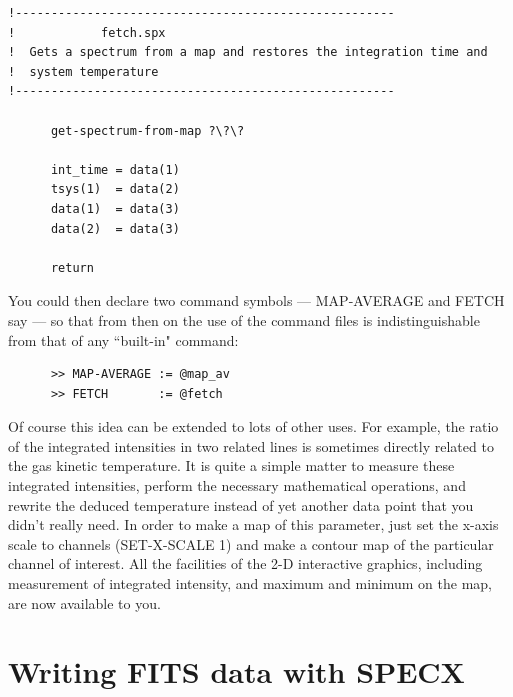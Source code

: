 \documentclass[11pt,twoside]{report}
\begin{document}
\begin{verbatim}
!-----------------------------------------------------
!            fetch.spx
!  Gets a spectrum from a map and restores the integration time and
!  system temperature
!-----------------------------------------------------

      get-spectrum-from-map ?\?\?

      int_time = data(1)
      tsys(1)  = data(2)
      data(1)  = data(3)
      data(2)  = data(3)

      return
\end{verbatim}

You could then declare two command symbols --- MAP-AVERAGE and FETCH say --- so
that from then on the use of the command files is indistinguishable from that
of any ``built-in" command:

\begin{verbatim}
      >> MAP-AVERAGE := @map_av
      >> FETCH       := @fetch
\end{verbatim}

Of course this idea can be extended to lots of other uses. For example,
the ratio of the integrated intensities in two related lines is sometimes
directly related to the gas kinetic temperature. It is quite a simple matter
to measure these integrated intensities, perform the necessary mathematical
operations, and rewrite the deduced temperature instead of yet another
data point that you didn't really need. In order to make a map of this
parameter, just set the x-axis scale to channels (SET-X-SCALE 1) and
make a contour map of the particular channel of interest. All the facilities
of the 2-D interactive graphics, including measurement of integrated intensity,
and maximum and minimum on the map, are now available to you.


\newpage
\chapter{Writing FITS data with SPECX}
\end{document}
